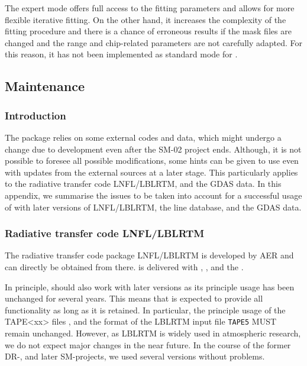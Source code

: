 The expert mode offers full access to the \mf{} fitting parameters and
allows for more flexible iterative fitting. On the other hand, it increases
the complexity of the fitting procedure and there is a chance of erroneous
results if the mask files are changed and the range and chip-related parameters
are not carefully adapted. For this reason, it has not been implemented as
standard mode for \mf.

\subsection{Maintenance}\label{app:maintenance}
\subsubsection{Introduction}
The package \mf{} relies on some external codes and data, which might undergo a
change due to development even after the SM-02 project ends. Although, it is
not possible to foresee all possible modifications, some hints can be given to
use \mf{} even with updates from the external sources at a later stage. This
particularly applies to the radiative transfer code LNFL/LBLRTM, and the GDAS
data. In this appendix, we summarise the issues to be taken into account for a
successful usage of \mf{} with later versions of LNFL/LBLRTM, the line
database, and the GDAS data.

\subsubsection{Radiative transfer code LNFL/LBLRTM}\label{app:lblrtm}
The radiative transfer code package LNFL/LBLRTM is developed by
AER\cite{LBLRTM} and can directly be obtained from there. \mf{} is delivered
with \lnflv, \lblrtmv, and the \aerv.

In principle, \mf{} should also work with later versions as its principle usage
has been unchanged for several years. This means that \mf{} is expected to
provide all functionality as long as it is retained. In particular, the
principle usage of the TAPE<xx> files \cite{LBLRTMFAQ}, and the format of the
LBLRTM input file {\tt TAPE5} MUST remain unchanged. However, as LBLRTM is
widely used in atmospheric research, we do not expect major changes in the near
future. In the course of the former DR-, and later SM-projects, we used several
versions without problems.

